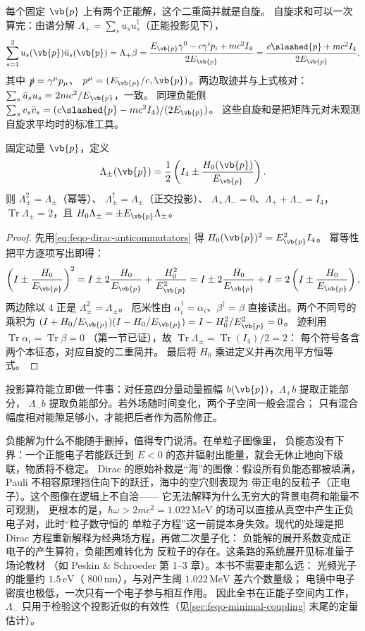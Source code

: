 每个固定 \(\vb{p}\) 上有两个正能解，这个二重简并就是自旋。
自旋求和可以一次算完：由谱分解
\(\Lambda_+=\sum_su_su_s^\dagger\)（正能投影见下），
\[
\sum_{s=1}^2u_s(\vb{p})\bar u_s(\vb{p})
=\Lambda_+\beta
=\frac{E_{\vb{p}}\gamma^0-c\gamma^ip_i+mc^2I_4}{2E_{\vb{p}}}
=\frac{c\slashed{p}+mc^2I_4}{2E_{\vb{p}}},
\]
其中 \(\slashed{p}=\gamma^\mu p_\mu\)、
\(p^\mu=(E_{\vb{p}}/c,\vb{p})\)。两边取迹并与上式核对：
\(\sum_s\bar u_su_s=2mc^2/E_{\vb{p}}\)，一致。
同理负能侧 \(\sum_sv_s\bar v_s=(c\slashed{p}-mc^2I_4)/(2E_{\vb{p}})\)。
这些自旋和是把矩阵元对未观测自旋求平均时的标准工具。


\begin{proposition}
固定动量 \(\vb{p}\)，定义
\[
\Lambda_\pm(\vb{p})
=\frac12\left(I_4\pm\frac{H_0(\vb{p})}{E_{\vb{p}}}\right).
\]
则 \(\Lambda_\pm^2=\Lambda_\pm\)（幂等）、
\(\Lambda_\pm^\dagger=\Lambda_\pm\)（正交投影）、
\(\Lambda_+\Lambda_-=0\)、\(\Lambda_++\Lambda_-=I_4\)，
\(\operatorname{Tr}\Lambda_\pm=2\)，且
\(H_0\Lambda_\pm=\pm E_{\vb{p}}\Lambda_\pm\)。
\end{proposition}
\begin{proof}
先用\cref{eq:feqo-dirac-anticommutators} 得
\(H_0(\vb{p})^2=E_{\vb{p}}^2I_4\)。
幂等性把平方逐项写出即得：
\[
\left(I\pm\frac{H_0}{E_{\vb{p}}}\right)^2
=I\pm2\frac{H_0}{E_{\vb{p}}}+\frac{H_0^2}{E_{\vb{p}}^2}
=I\pm2\frac{H_0}{E_{\vb{p}}}+I
=2\left(I\pm\frac{H_0}{E_{\vb{p}}}\right),
\]
两边除以 \(4\) 正是 \(\Lambda_\pm^2=\Lambda_\pm\)。
厄米性由 \(\alpha_i^\dagger=\alpha_i\)、\(\beta^\dagger=\beta\)
直接读出。两个不同号的乘积为
\((I+H_0/E_{\vb{p}})(I-H_0/E_{\vb{p}})
=I-H_0^2/E_{\vb{p}}^2=0\)。
迹利用 \(\operatorname{Tr}\alpha_i=\operatorname{Tr}\beta=0\)
（第一节已证），故
\(\operatorname{Tr}\Lambda_\pm=\operatorname{Tr}(I_4)/2=2\)：
每个符号各含两个本征态，对应自旋的二重简并。
最后将 \(H_0\) 乘进定义并再次用平方恒等式。
\end{proof}

投影算符能立即做一件事：对任意四分量动量振幅
\(b(\vb{p})\)，\(\Lambda_+b\) 提取正能部分，
\(\Lambda_-b\) 提取负能部分。若外场随时间变化，两个子空间一般会混合；
只有混合幅度相对能隙足够小，才能把后者作为高阶修正。

负能解为什么不能随手删掉，值得专门说清。在单粒子图像里，
负能态没有下界：一个正能电子若能跃迁到 \(E<0\)
的态并辐射出能量，就会无休止地向下级联，物质将不稳定。
Dirac 的原始补救是“海”的图像：假设所有负能态都被填满，
Pauli 不相容原理挡住向下的跃迁，海中的空穴则表现为
带正电的反粒子（正电子）。这个图像在逻辑上不自洽——
它无法解释为什么无穷大的背景电荷和能量不可观测，
更根本的是，\(\hbar\omega>2mc^2=1.022\,\si{\mega\electronvolt}\)
的场可以直接从真空中产生正负电子对，此时“粒子数守恒的
单粒子方程”这一前提本身失效。现代的处理是把 Dirac
方程重新解释为经典场方程，再做二次量子化：
负能解的展开系数变成正电子的产生算符，负能困难转化为
反粒子的存在。这条路的系统展开见标准量子场论教材
（如 Peskin \& Schroeder 第 1--3 章）。本书不需要走那么远：
光频光子的能量约 \(1.5\,\si{\electronvolt}\)（
\(800\,\si{\nano\metre}\)），与对产生阈
\(1.022\,\si{\mega\electronvolt}\) 差六个数量级；
电镜中电子密度也极低，一次只有一个电子参与相互作用。
因此全书在正能子空间内工作，\(\Lambda_-\)
只用于检验这个投影近似的有效性（见\cref{sec:feqo-minimal-coupling}
末尾的定量估计）。


